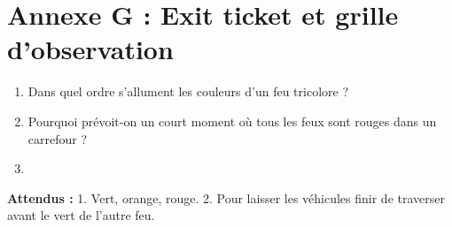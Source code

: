 \documentclass[11pt,a4paper]{article}
\begin{document}
\newpage
\section*{Annexe G : Exit ticket et grille d'observation}

\begin{enumerate}
 \item Dans quel ordre s'allument les couleurs d'un feu tricolore ?\\ \lig
 \item Pourquoi prévoit-on un court moment où tous les feux sont rouges dans un carrefour ?\\ \lig
 \item \autoeval
\end{enumerate}
\textbf{Attendus :} 1. Vert, orange, rouge. 2. Pour laisser les véhicules finir de traverser avant le vert de l'autre feu.

\bigskip
{}
\end{document}
